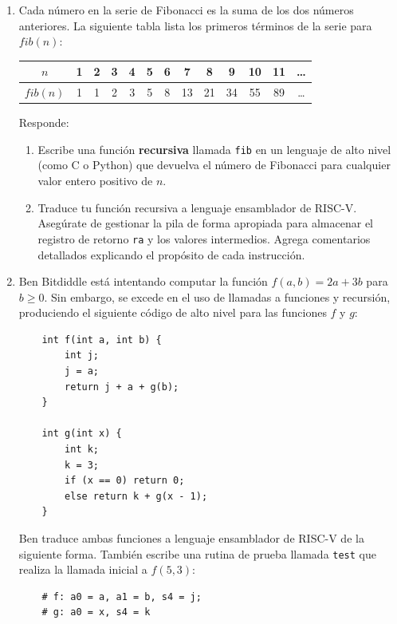 \documentclass[letterpaper,12pt]{article}
\begin{document}
\begin{enumerate}
    \vspace{0.5cm}
    \pagebreak

    \item Cada número en la serie de Fibonacci es la suma de los dos números anteriores. La siguiente tabla lista los primeros términos de la serie para $fib(n)$:
    
    \begin{table}[H]
        \centering
        \begin{tabular}{|c|c|c|c|c|c|c|c|c|c|c|c|c|}
            \hline
            \textbf{$n$} & 1 & 2 & 3 & 4 & 5 & 6 & 7 & 8 & 9 & 10 & 11 & \dots \\
            \hline
            \textbf{$fib(n)$} & 1 & 1 & 2 & 3 & 5 & 8 & 13 & 21 & 34 & 55 & 89 & \dots \\
            \hline
        \end{tabular}
    \end{table}
    
    Responde:
    \begin{enumerate}[label=\alph*)]
        \item Escribe una función \textbf{recursiva} llamada \texttt{fib} en un lenguaje de alto nivel (como C o Python) que devuelva el número de Fibonacci para cualquier valor entero positivo de $n$.
        \item Traduce tu función recursiva a lenguaje ensamblador de RISC-V. Asegúrate de gestionar la pila de forma apropiada para almacenar el registro de retorno \texttt{ra} y los valores intermedios. Agrega comentarios detallados explicando el propósito de cada instrucción.
    \end{enumerate}

    \vspace{0.5cm}

    \item Ben Bitdiddle está intentando computar la función $f(a, b) = 2a + 3b$ para $b \geq 0$. Sin embargo, se excede en el uso de llamadas a funciones y recursión, produciendo el siguiente código de alto nivel para las funciones $f$ y $g$:
    \begin{verbatim}
    int f(int a, int b) {
        int j;
        j = a;
        return j + a + g(b);
    }
    
    int g(int x) {
        int k;
        k = 3;
        if (x == 0) return 0;
        else return k + g(x - 1);
    }
    \end{verbatim}
    Ben traduce ambas funciones a lenguaje ensamblador de RISC-V de la siguiente forma. También escribe una rutina de prueba llamada \texttt{test} que realiza la llamada inicial a $f(5, 3)$:
   	\pagebreak
    \begin{verbatim}
    # f: a0 = a, a1 = b, s4 = j;
    # g: a0 = x, s4 = k


\end{verbatim}
\end{enumerate}
\end{document}
